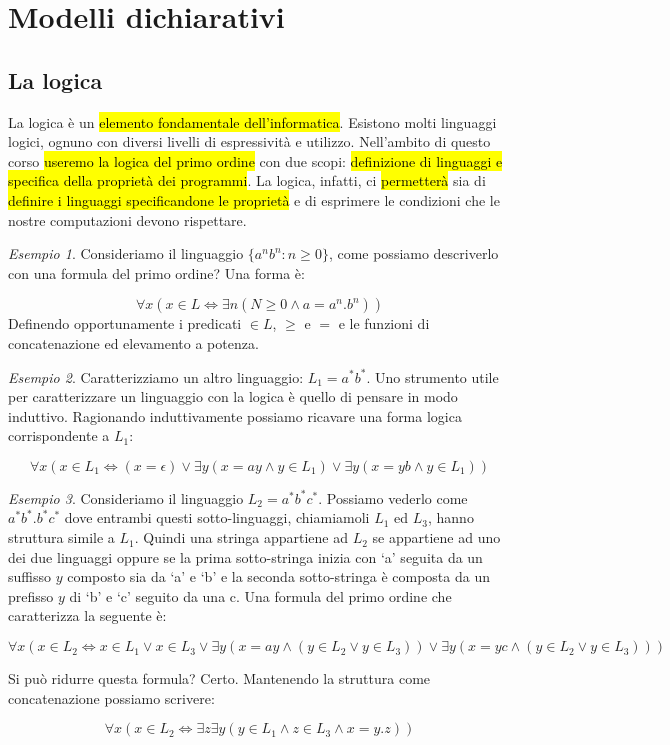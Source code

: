 \documentclass[a4paper,11pt,oneside]{article}
\theoremstyle{plain}
\theoremstyle{definition}
\theoremstyle{remark}
\newtheorem{esempio}{Esempio}[section]
\begin{document}
\section{Modelli dichiarativi}\label{sec:modelli-dichairativi}

\subsection{La logica}\label{sec:logica}

La logica è un \hl{elemento fondamentale dell'informatica}. Esistono molti
linguaggi logici, ognuno con diversi livelli di espressività e utilizzo.
Nell'ambito di questo corso \hl{useremo la logica del primo ordine} con due
scopi: \hl{definizione di linguaggi e specifica della proprietà dei programmi}.
La logica, infatti, ci \hl{permetterà} sia di \hl{definire i linguaggi
specificandone le proprietà} e di esprimere le condizioni che le nostre
computazioni devono rispettare.

\begin{esempio}
  Consideriamo il linguaggio $\{a^n b^n : n \geq 0\}$, come possiamo descriverlo
  con una formula del primo ordine? Una forma è:

  \[
    \forall x (x \in L \iff \exists n (N \geq 0 \land a = a^n . b^n))
  \]
  Definendo opportunamente i predicati $\in L$, $\geq$ e $=$ e le funzioni di
  concatenazione ed elevamento a potenza.
\end{esempio}

\begin{esempio}
  Caratterizziamo un altro linguaggio: $L_1 = a^*b^*$. Uno strumento utile per
  caratterizzare un linguaggio con la logica è quello di pensare in modo
  induttivo. Ragionando induttivamente possiamo ricavare una forma logica
  corrispondente a $L_1$:

  \[
    \forall x (x \in L_1 \iff (x = \epsilon) \lor
    \exists y (x = ay \land y \in L_1) \lor \exists y (x = yb \land y \in L_1))
  \]
\end{esempio}

\begin{esempio}
  Consideriamo il linguaggio $L_2 = a^* b^* c^*$. Possiamo vederlo come $a^* b^*
  . b^* c^*$ dove entrambi questi sotto-linguaggi, chiamiamoli $L_1$ ed $L_3$,
  hanno struttura simile a $L_1$. Quindi una stringa appartiene ad $L_2$ se
  appartiene ad uno dei due linguaggi oppure se la prima sotto-stringa inizia
  con `a' seguita da un suffisso $y$ composto sia da `a' e `b' e la seconda
  sotto-stringa è composta da un prefisso $y$ di `b' e `c' seguito da una c. Una
  formula del primo ordine che caratterizza la seguente è:

  \[
    \forall x (x \in L_2 \iff x\in L_1 \lor x \in L_3 \lor
      \exists y (x = ay \land (y \in L_2 \lor y \in L_3)) \lor
      \exists y (x = yc \land (y \in L_2 \lor y \in L_3)))
  \]

  Si può ridurre questa formula? Certo. Mantenendo la struttura come
  concatenazione possiamo scrivere:

  \[
    \forall x (x \in L_2 \iff \exists z \exists y
     (y \in L_1 \land z \in L_3 \land x = y.z))
  \]
\end{esempio}
\end{document}
